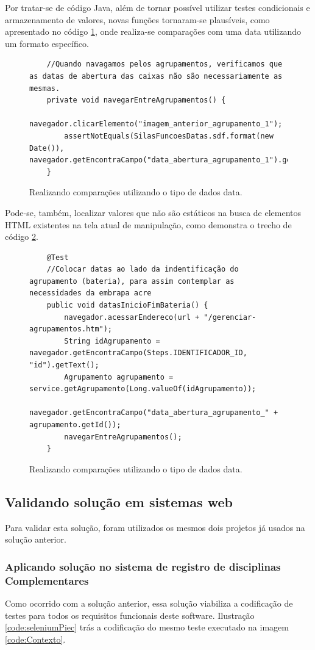 \documentclass[tg]{mdtufsm}
\begin{document}
Por tratar-se de código Java, além de tornar possível utilizar testes condicionais e armazenamento de valores, novas funções tornaram-se plausíveis, como apresentado no código \ref{code:seleniumDate}, onde realiza-se comparações com uma data utilizando um formato específico.

\begin{figure}[!htt]
	\begin{lstlisting}
	//Quando navagamos pelos agrupamentos, verificamos que as datas de abertura das caixas não são necessariamente as mesmas.
	private void navegarEntreAgrupamentos() {
		navegador.clicarElemento("imagem_anterior_agrupamento_1");
		assertNotEquals(SilasFuncoesDatas.sdf.format(new Date()), navegador.getEncontraCampo("data_abertura_agrupamento_1").getText());
	}
	\end{lstlisting}
	\caption{Realizando comparações utilizando o tipo de dados data.}
	\label{code:seleniumDate}
\end{figure}

Pode-se, também, localizar valores que não são estáticos na busca de elementos HTML existentes na tela atual de manipulação, como demonstra o trecho de código \ref{code:seleniumBuscaId}.

\begin{figure}[!htt]
	\begin{lstlisting}
	@Test
	//Colocar datas ao lado da indentificação do agrupamento (bateria), para assim contemplar as necessidades da embrapa acre
	public void datasInicioFimBateria() {
		navegador.acessarEndereco(url + "/gerenciar-agrupamentos.htm");
		String idAgrupamento = navegador.getEncontraCampo(Steps.IDENTIFICADOR_ID, "id").getText();
		Agrupamento agrupamento = service.getAgrupamento(Long.valueOf(idAgrupamento));
		navegador.getEncontraCampo("data_abertura_agrupamento_" + agrupamento.getId());
		navegarEntreAgrupamentos();
	}	
	\end{lstlisting}
	\caption{Realizando comparações utilizando o tipo de dados data.}
	\label{code:seleniumBuscaId}
\end{figure}


\subsection{Validando solução em sistemas web}
Para validar esta solução, foram utilizados os mesmos dois projetos já usados na solução anterior.

\subsubsection{Aplicando solução no sistema de registro de disciplinas Complementares}
Como ocorrido com a solução anterior, essa solução viabiliza a codificação de testes para todos os requisitos funcionais deste software. Ilustração \ref{code:seleniumPiec} trás a codificação do mesmo teste executado na imagem \ref{code:Contexto}.
\end{document}
